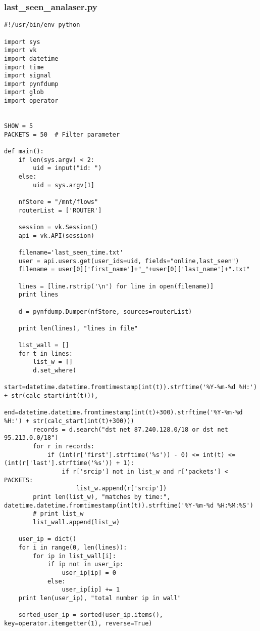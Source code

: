 \subsubsection{last{\_}seen{\_}analaser.py}
\begin{lstlisting}
#!/usr/bin/env python

import sys
import vk
import datetime
import time
import signal
import pynfdump
import glob
import operator


SHOW = 5
PACKETS = 50  # Filter parameter

def main():
    if len(sys.argv) < 2:
        uid = input("id: ")
    else:
        uid = sys.argv[1]

    nfStore = "/mnt/flows"
    routerList = ['ROUTER']

    session = vk.Session()
    api = vk.API(session)

    filename='last_seen_time.txt'
    user = api.users.get(user_ids=uid, fields="online,last_seen")
    filename = user[0]['first_name']+"_"+user[0]['last_name']+".txt"

    lines = [line.rstrip('\n') for line in open(filename)]
    print lines

    d = pynfdump.Dumper(nfStore, sources=routerList)

    print len(lines), "lines in file"

    list_wall = []
    for t in lines:
        list_w = []
        d.set_where(
            start=datetime.datetime.fromtimestamp(int(t)).strftime('%Y-%m-%d %H:') + str(calc_start(int(t))),
            end=datetime.datetime.fromtimestamp(int(t)+300).strftime('%Y-%m-%d %H:') + str(calc_start(int(t)+300)))
        records = d.search("dst net 87.240.128.0/18 or dst net 95.213.0.0/18")
        for r in records:
            if (int(r['first'].strftime('%s')) - 0) <= int(t) <= (int(r['last'].strftime('%s')) + 1):
                if r['srcip'] not in list_w and r['packets'] < PACKETS:
                    list_w.append(r['srcip'])
        print len(list_w), "matches by time:", datetime.datetime.fromtimestamp(int(t)).strftime('%Y-%m-%d %H:%M:%S')
        # print list_w
        list_wall.append(list_w)

    user_ip = dict()
    for i in range(0, len(lines)):
        for ip in list_wall[i]:
            if ip not in user_ip:
                user_ip[ip] = 0
            else:
                user_ip[ip] += 1
    print len(user_ip), "total number ip in wall"

    sorted_user_ip = sorted(user_ip.items(), key=operator.itemgetter(1), reverse=True)


\end{lstlisting}
